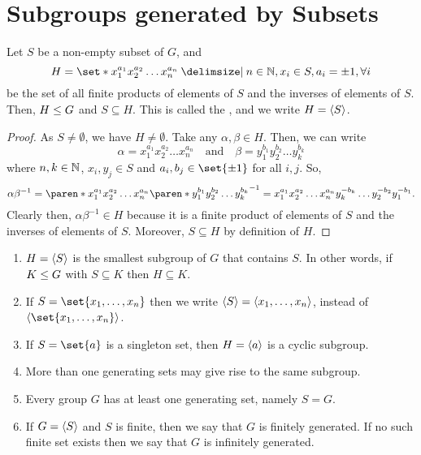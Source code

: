 \documentclass[11pt]{penrose}
\begin{document}
\section{Subgroups generated by Subsets}

\begin{nthm}
    Let $S$ be a non-empty subset of $G$, and
    \begin{equation*}
        H = \set*{ x_{1}^{a_{1}} x_{2}^{a_{2}} \dots x_{n}^{a_{n}} \st n \in \N, x_{i} \in S, a_{i} = \pm 1, \forall i}
    \end{equation*}
    be the set of all finite products of elements of $S$ and the inverses of elements of $S$. Then, $H \mathrel{\leq} G$ and $S \subseteq H$. This is called the , and we write $H = \langle S\rangle$.
\end{nthm}
\begin{proof}
    As $S \neq \emptyset$, we have $H \neq \emptyset$. Take any $\alpha, \beta \in H$. Then, we can write
    \begin{equation*}
        \alpha = x_{1}^{a_{1}} x_{2}^{a_{2}} \dots x_{n}^{a_{n}}
        \quad\text{and}\quad
        \beta = y_{1}^{b_{1}} y_{2}^{b_{2}} \dots y_{k}^{b_{k}}
    \end{equation*}
    where $n, k \in \mathbb{N}$, $x_{i}, y_{j} \in S$ and $a_{i}, b_{j} \in \set{\pm 1}$ for all $i, j$. So,
    \begin{equation*}
        \alpha \beta^{-1}
        = \paren*{ x_{1}^{a_{1}} x_{2}^{a_{2}} \dots x_{n}^{a_{n}} } \paren*{ y_{1}^{b_{1}} y_{2}^{b_{2}} \dots y_{k}^{b_{k}} }^{-1}
        = x_{1}^{a_{1}} x_{2}^{a_{2}} \dots x_{n}^{a_{n}} y_{k}^{-b_{k}} \dots y_{2}^{-b_{2}} y_{1}^{-b_{1}}.
    \end{equation*}
    Clearly then, $\alpha\beta^{-1} \in H$ because it is a finite product of elements of $S$ and the inverses of elements of $S$. Moreover, $S \subseteq H$ by definition of $H$.
\end{proof}

\begin{remark}\phantom{}
    \begin{enumerate}
        \item $H = \langle S\rangle$ is the smallest subgroup of $G$ that contains $S$. In other words, if $K \mathrel{\leq} G$ with $S \subseteq K$ then $H \subseteq K$.
        \item If $S = \set{x_{1}, \dots, x_{n}}$ then we write $\langle S\rangle = \langle x_{1}, \dots, x_{n}\rangle$, instead of $\cyclic{\set{x_{1}, \dots, x_{n}}}$.
        \item If $S = \set{a}$ is a singleton set, then $H = \langle a\rangle$ is a cyclic subgroup.
        \item More than one generating sets may give rise to the same subgroup.
        \item Every group $G$ has at least one generating set, namely $S = G$.
        \item If $G = \langle S\rangle$ and $S$ is finite, then we say that $G$ is finitely generated. If no such finite set exists then we say that $G$ is infinitely generated.
    \end{enumerate}
\end{remark}
\end{document}
